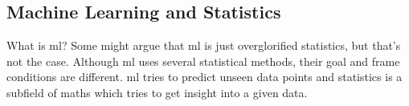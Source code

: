 \subsection{Machine Learning and Statistics}

What is \gls{ml}? Some might argue that \gls{ml} is just overglorified statistics, but that's not the case. 
Although \gls{ml} uses several statistical methods, their goal and frame conditions are different. 
%
%
\Gls{ml} tries to predict unseen data points and statistics is a subfield of maths 
which tries to get insight into a given data. 
